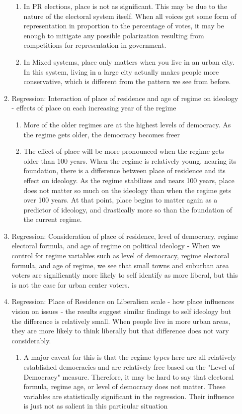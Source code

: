 \documentclass[12pt]{article}
\begin{document}
\begin{enumerate}
\begin{enumerate}
\begin{enumerate}
		\item In PR elections, place is not as significant. This may be due to the nature of the electoral system itself. When all voices get some form of representation in proportion to the percentage of votes, it may be enough to mitigate any possible polarization resulting from competitions for representation in government.
		\item In Mixed systems, place only matters when you live in an urban city. In this system, living in a large city actually makes people more conservative, which is different from the pattern we see from before.
	\end{enumerate}
	\item Regression: Interaction of place of residence and age of regime on ideology - effects of place on each increasing year of the regime
	\begin{enumerate}
		\item More of the older regimes are at the highest levels of democracy. As the regime gets older, the democracy becomes freer
		\item The effect of place will be more pronounced when the regime gets older than 100 years. When the regime is relatively young, nearing its foundation, there is a difference between place of residence and its effect on ideology. As the regime stabilizes and nears 100 years, place does not matter so much on the ideology than when the regime gets over 100 years. At that point, place begins to matter again as a predictor of ideology, and drastically more so than the foundation of the current regime.
	\end{enumerate}
	\item Regression: Consideration of place of residence, level of democracy, regime electoral formula, and age of regime on political ideology - When we control for regime variables such as level of democracy, regime electoral formula, and age of regime, we see that small towns and suburban area voters are significantly more likely to self identify as more liberal, but this is not the case for urban center voters.
	\item Regression: Place of Residence on Liberalism scale - how place influences vision on issues - the results suggest similar findings to self ideology but the difference is relatively small. When people live in more urban areas, they are more likely to think liberally but that difference does not vary considerably. 
	\begin{enumerate}
		\item A major caveat for this is that the regime types here are all relatively established democracies and are relatively free based on the "Level of Democracy" measure. Therefore, it may be hard to say that electoral formula, regime age, or level of democracy does not matter. These variables are statistically significant in the regression. Their influence is just not as salient in this particular situation

\end{enumerate}
\end{enumerate}
\end{enumerate}
\end{document}
